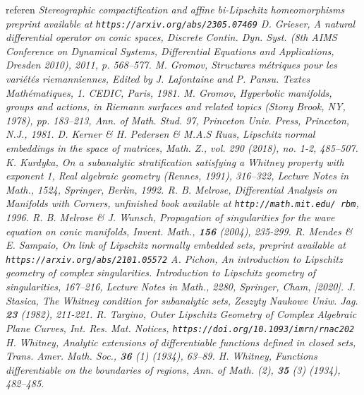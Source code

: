 \documentclass[11pt]{amsart}
\numberwithin{equation}{section}
\numberwithin{equation}{section}
\begin{document}
\begin{thebibliography}{referen}
\em Stereographic compactification and affine bi-Lipschitz homeomorphisms
\rm preprint available at {\tt https://arxiv.org/abs/2305.07469} 
%
 \sc D. Grieser,
\em A natural differential operator on conic spaces, 
\rm Discrete Contin. Dyn. Syst. (8th AIMS Conference on Dynamical Systems, 
Differential Equations and Applications, Dresden 2010), 2011, p. 568--577.
%
 \sc M. Gromov,
\em Structures m\'etriques pour les vari\'et\'es riemanniennes, 
\rm Edited by J. Lafontaine and P. Pansu. Textes Math\'ematiques, 1. CEDIC, Paris, 1981.
%
 \sc M. Gromov, 
\em Hyperbolic manifolds, groups and actions,
\rm  in Riemann surfaces and related topics (Stony Brook, NY, 1978), pp. 183--213,
Ann. of Math. Stud. 97, Princeton Univ. Press, Princeton, N.J., 1981.
%
 \sc D. Kerner \& H. Pedersen \& M.A.S Ruas, 
\em Lipschitz normal embeddings in the space of matrices, 
\rm Math. Z., vol. 290 (2018), no. 1-2, 485--507.
%
 \sc K. Kurdyka, 
\em On a subanalytic stratification satisfying a Whitney property
with exponent 1, \rm  Real algebraic geometry (Rennes, 1991), 316--322, 
Lecture Notes in Math., 1524, Springer, Berlin, 1992.
%
 \sc R. B. Melrose,
\em Differential Analysis on Manifolds with Corners, 
\rm unfinished book available at {\tt http://math.mit.edu/~rbm}, 1996.
%
 \sc R. B. Melrose \&  J. Wunsch, 
\em Propagation of singularities for the wave equation on
conic manifolds,
\rm Invent. Math., {\bf 156} (2004), 235-299.
%
 \sc R. Mendes \& E. Sampaio,
\em On link of Lipschitz normally embedded sets,
\rm preprint available at {\tt https://arxiv.org/abs/2101.05572}
 \sc A. Pichon, 
\em An introduction to Lipschitz geometry of complex singularities.
\rm Introduction to Lipschitz geometry of singularities, 167--216, 
Lecture Notes in Math., 2280, Springer, Cham, [2020]. 
%
 \sc J. Stasica, 
\em The Whitney condition for subanalytic sets,
\rm Zeszyty Naukowe Uniw. Jag. {\bf 23} (1982), 211-221.
%
 \sc R. Targino,
\em Outer Lipschitz Geometry of Complex Algebraic Plane Curves,
\rm Int. Res. Mat. Notices,
{\tt https://doi.org/10.1093/imrn/rnac202}
%
%
 \sc H. Whitney, 
\em Analytic extensions of differentiable functions defined in closed sets,
\rm Trans. Amer. Math. Soc., {\bf 36} (1) (1934), 63–89.
%
 \sc H. Whitney, 
\em Functions differentiable on the boundaries of regions,
\rm Ann. of Math. (2), {\bf 35} (3) (1934), 482–485.

\end{thebibliography}
\end{document}
